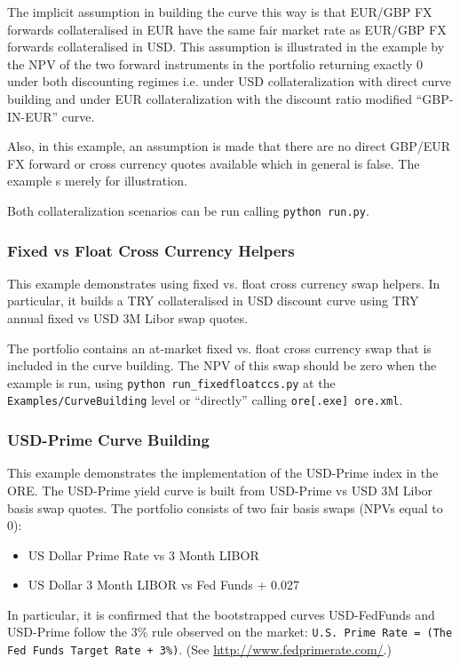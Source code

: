 The implicit assumption in building the curve this way is that EUR/GBP FX
forwards collateralised in EUR have the same fair market rate as EUR/GBP
FX forwards collateralised in USD. This assumption is illustrated in the
example by the NPV of the two forward instruments in the portfolio returning
exactly 0 under both discounting regimes i.e. under USD collateralization with
direct curve building and under EUR collateralization with the discount ratio
modified ``GBP-IN-EUR'' curve.

Also, in this example, an assumption is made that there are no direct GBP/EUR FX
forward or cross currency quotes available which in general is false. The example
s merely for illustration.

Both collateralization scenarios can be run calling {\tt python run.py}.

\subsubsection{Fixed vs Float Cross Currency Helpers}

This example demonstrates using fixed vs. float
cross currency swap helpers. In particular, it builds a TRY collateralised in USD
discount curve using TRY annual fixed vs USD 3M Libor swap quotes.

The portfolio contains an at-market fixed vs. float cross currency swap that is
included in the curve building. The NPV of this swap should be zero when the example is run,
using {\tt python run\_fixedfloatccs.py} at the {\tt Examples/CurveBuilding} level or
``directly'' calling {\tt ore[.exe] ore.xml}.

\subsubsection{USD-Prime Curve Building}

This example demonstrates the implementation of the USD-Prime index in the ORE.
The USD-Prime yield curve is built from USD-Prime vs USD 3M Libor basis swap quotes.
The portfolio consists of two fair basis swaps (NPVs equal to 0):
\begin{itemize}
\item US Dollar Prime Rate vs 3 Month LIBOR
\item US Dollar 3 Month LIBOR vs Fed Funds + 0.027
\end{itemize}

In particular, it is confirmed that the bootstrapped curves USD-FedFunds and USD-Prime follow
the 3\% rule observed on the market: {\tt U.S. Prime Rate = (The Fed Funds Target Rate + 3\%)}.
(See \url{http://www.fedprimerate.com/}.)

